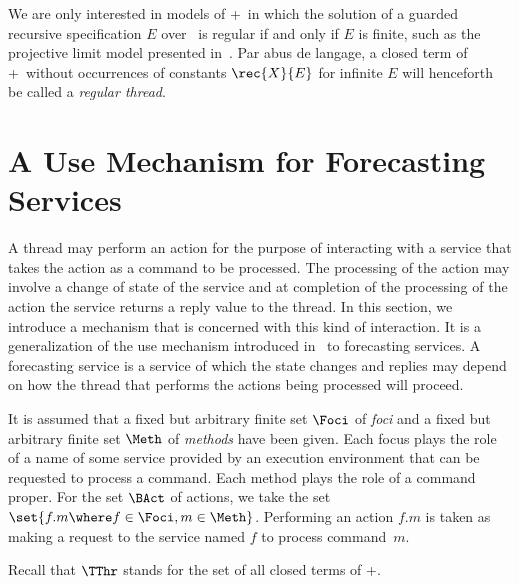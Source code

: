 \documentclass[fleqn]{llncs}
\begin{document}
We are only interested in models of \BTA+\REC\ in which the solution of
a guarded recursive specification $E$ over \BTA\ is regular if and only
if $E$ is finite, such as the projective limit model presented
in~\cite{BB03a}.
Par abus de langage, a closed term of \BTA+\REC\ without occurrences of
constants $\rec{X}{E}$ for infinite $E$ will henceforth be called a
\emph{regular thread}.

\section{A Use Mechanism for Forecasting Services}
\label{sect-TSI}

A thread may perform an action for the purpose of interacting with a
service that takes the action as a command to be processed.
The processing of the action may involve a change of state of the
service and at completion of the processing of the action the service
returns a reply value to the thread.
In this section, we introduce a mechanism that is concerned with this
kind of interaction.
It is a generalization of the use mechanism introduced in~\cite{BM08d}
to forecasting services.
A forecasting service is a service of which the state changes and
replies may depend on how the thread that performs the actions being
processed will proceed.

It is assumed that a fixed but arbitrary finite set $\Foci$ of
\emph{foci} and a fixed but arbitrary finite set $\Meth$ of
\emph{methods} have been given.
Each focus plays the role of a name of some service provided by an
execution environment that can be requested to process a command.
Each method plays the role of a command proper.
For the set $\BAct$ of actions, we take the set
$\set{f.m \where f \in \Foci, m \in \Meth}$.
Performing an action $f.m$ is taken as making a request to the
service named $f$ to process command~$m$.

Recall that $\TThr$ stands for the set of all closed terms of \BTA+\REC.
\end{document}
